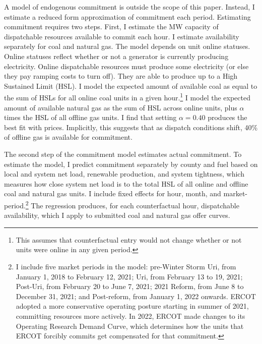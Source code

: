 \documentclass[12pt]{article}
\begin{document}
A model of endogenous commitment is outside the scope of this paper. Instead, I estimate a reduced form approximation of commitment each period. Estimating commitment requires two steps. First, I estimate the MW capacity of dispatchable resources available to commit each hour. I estimate availability separately for coal and natural gas. The model depends on unit online statuses. Online statuses reflect whether or not a generator is currently producing electricity. Online dispatchable resources must produce some electricity (or else they pay ramping costs to turn off). They are able to produce up to a High Sustained Limit (HSL). I model the expected amount of available coal as equal to the sum of HSLs for all online coal units in a given hour.\footnote{This assumes that counterfactual entry would not change whether or not units were online in any given period.} I model the expected amount of available natural gas as the sum of HSL across online units, plus $\alpha$ times the HSL of all offline gas units. I find that setting $\alpha=0.40$ produces the best fit with prices. Implicitly, this suggests that as dispatch conditions shift, 40\% of offline gas is available for commitment. 

The second step of the commitment model estimates actual commitment. To estimate the model, I predict commitment separately by county and fuel based on local and system net load, renewable production, and system tightness, which measures how close system net load is to the total HSL of all online and offline coal and natural gas units. I include fixed effects for hour, month, and market-period.\footnote{I include five market periods in the model: pre-Winter Storm Uri, from January 1, 2018 to February 12, 2021; Uri, from February 13 to 19, 2021; Post-Uri, from February 20 to June 7, 2021; 2021 Reform, from June 8 to December 31, 2021; and Post-reform, from January 1, 2022 onwards. ERCOT adopted a more conservative operating posture starting in summer of 2021, committing resources more actively. In 2022, ERCOT made changes to its Operating Research Demand Curve, which determines how the units that ERCOT forcibly commits get compensated for that commitment.} The regression produces, for each counterfactual hour, dispatchable availability, which I apply to submitted coal and natural gas offer curves. 
\end{document}
